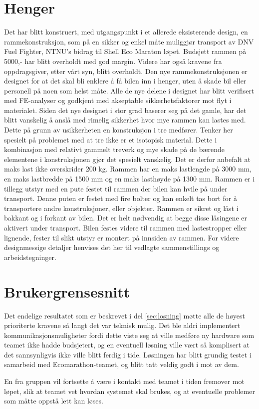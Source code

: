 \section{Henger}
Det har blitt konstruert, med utgangspunkt i et allerede eksisterende design, en rammekonstruksjon, som på en sikker og enkel måte muliggjør transport av DNV Fuel Fighter, NTNU’s bidrag til Shell Eco Maraton løpet. Budsjett rammen på 5000,- har blitt overholdt med god margin. Videre har også kravene fra oppdragsgiver, etter vårt syn, blitt overholdt. Den nye rammekonstruksjonen er designet for at det skal bli enklere å få bilen inn i henger, uten å skade bil eller personell på noen som helst måte. 
Alle de nye delene i designet har blitt verifisert med FE-analyser og godkjent med akseptable sikkerhetsfaktorer mot flyt i materialet. 
Siden det nye designet i stor grad baserer seg på det gamle, har det blitt vanskelig å anslå med rimelig sikkerhet hvor mye rammen kan lastes med. Dette på grunn av usikkerheten en konstruksjon i tre medfører. Tenker her spesielt på problemet med at tre ikke er et isotopisk material. Dette i kombinasjon med relativt gammelt treverk og mye skade på de bærende elementene i konstruksjonen gjør det spesielt vanskelig. Det er derfor anbefalt at maks last ikke overskrider 200 kg. Rammen har en maks lastlengde på 3000 mm, en maks lastbredde på 1500 mm og en maks lasthøyde på 1300 mm. 
Rammen er i tillegg utstyr med en pute festet til rammen der bilen kan hvile på under transport. Denne puten er festet med fire bolter og kan enkelt tas bort for å transportere andre konstruksjoner, eller objekter. 
Rammen er sikret og låst i bakkant og i forkant av bilen. Det er helt nødvendig at begge disse låsingene er aktivert under transport. Bilen festes videre til rammen med lastestropper eller lignende, fester til slikt utstyr er montert på innsiden av rammen. For videre designmessige detaljer henvises det her til vedlagte sammenstillings og arbeidstegninger.
\section{Brukergrensesnitt}
Det endelige resultatet som er beskrevet i del \ref{sec:losning} møtte alle de høyest prioriterte kravene så langt det var teknisk mulig.
Det ble aldri implementert kommunikasjonsmuligheter fordi dette viste seg at ville medføre ny hardware som teamet ikke hadde budsjetert, og en eventuell løsning ville vært så komplisert at det sannsynligvis ikke ville blitt ferdig i tide.
Løsningen har blitt grundig testet i samarbeid med Ecomarathon-teamet, og blitt tatt veldig godt i mot av dem.

En fra gruppen vil fortsette å være i kontakt med teamet i tiden fremover mot løpet, slik at teamet vet hvordan systemet skal brukes, og at eventuelle problemer som måtte oppstå lett kan løses.
